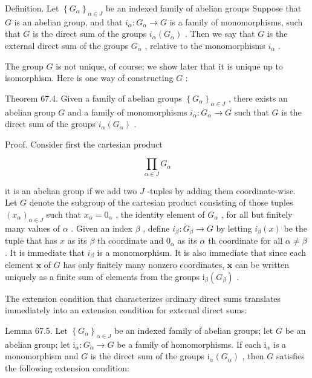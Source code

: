 Definition. Let \({\left\{  {G}_{\alpha }\right\}  }_{\alpha  \in  J}\) be an indexed family of abelian groups Suppose that \(G\) is an abelian group, and that \({i}_{\alpha } : {G}_{\alpha } \rightarrow  G\) is a family of monomorphisms, such that \(G\) is the direct sum of the groups \({i}_{\alpha }\left( {G}_{\alpha }\right)\) . Then we say that \(G\) is the external direct sum of the groups \({G}_{\alpha }\) , relative to the monomorphisms \({i}_{\alpha }\) .

The group \(G\) is not unique, of course; we show later that it is unique up to isomorphism. Here is one way of constructing \(G\) :

Theorem 67.4. Given a family of abelian groups \({\left\{  {G}_{\alpha }\right\}  }_{\alpha  \in  J}\) , there exists an abelian group \(G\) and a family of monomorphisms \({i}_{\alpha } : {G}_{\alpha } \rightarrow  G\) such that \(G\) is the direct sum of the groups \({i}_{\alpha }\left( {G}_{\alpha }\right)\) .

Proof. Consider first the cartesian product

\[
\mathop{\prod }\limits_{{\alpha  \in  J}}{G}_{\alpha }
\]

it is an abelian group if we add two \(J\) -tuples by adding them coordinate-wise. Let \(G\) denote the subgroup of the cartesian product consisting of those tuples \({\left( {x}_{\alpha }\right) }_{\alpha  \in  J}\) such that \({x}_{\alpha } = {0}_{\alpha }\) , the identity element of \({G}_{\alpha }\) , for all but finitely many values of \(\alpha\) . Given an index \(\beta\) , define \({i}_{\beta } : {G}_{\beta } \rightarrow  G\) by letting \({i}_{\beta }\left( x\right)\) be the tuple that has \(x\) as its \(\beta\) th coordinate and \({0}_{\alpha }\) as its \(\alpha\) th coordinate for all \(\alpha  \neq  \beta\) . It is immediate that \({i}_{\beta }\) is a monomorphism. It is also immediate that since each element \(\mathbf{x}\) of \(G\) has only finitely many nonzero coordinates, \(\mathbf{x}\) can be written uniquely as a finite sum of elements from the groups \({\mathrm{i}}_{\beta }\left( {G}_{\beta }\right)\) .

The extension condition that characterizes ordinary direct sums translates immediately into an extension condition for external direct sums:

Lemma 67.5. Let \({\left\{  {G}_{\alpha }\right\}  }_{\alpha  \in  J}\) be an indexed family of abelian groups; let \(G\) be an abelian group; let \({\mathrm{i}}_{\alpha } : {G}_{\alpha } \rightarrow  G\) be a family of homomorphisms. If each \({\mathrm{i}}_{\alpha }\) is a monomorphism and \(G\) is the direct sum of the groups \({\mathrm{i}}_{\alpha }\left( {G}_{\alpha }\right)\) , then \(G\) satisfies the following extension condition:

